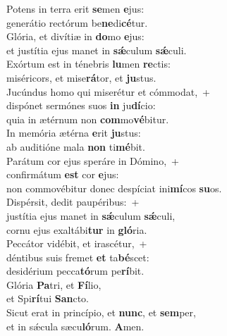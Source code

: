 \evenverse Potens in terra erit \textbf{se}men \textbf{e}jus:~\*\\
\evenverse generátio rectórum be\textbf{ne}di\textbf{cé}tur.\\
\oddverse Glória, et divítiæ in \textbf{do}mo \textbf{e}jus:~\*\\
\oddverse et justítia ejus manet in \textbf{sǽ}culum \textbf{sǽ}culi.\\
\evenverse Exórtum est in ténebris \textbf{lu}men \textbf{re}ctis:~\*\\
\evenverse miséricors, et mise\textbf{rá}tor, et \textbf{ju}stus.\\
\oddverse Jucúndus homo qui miserétur et cómmodat,~+\\
\oddverse  dispónet sermónes suos \textbf{in} ju\textbf{dí}cio:~\*\\
\oddverse quia in ætérnum non \textbf{com}mo\textbf{vé}bitur.\\
\evenverse In memória ætérna \textbf{e}rit \textbf{ju}stus:~\*\\
\evenverse ab auditióne mala \textbf{non} ti\textbf{mé}bit.\\
\oddverse Parátum cor ejus speráre in Dómino,~+\\
\oddverse  confirmátum \textbf{est} cor \textbf{e}jus:~\*\\
\oddverse non commovébitur donec despíciat ini\textbf{mí}cos \textbf{su}os.\\
\evenverse Dispérsit, dedit paupéribus:~+\\
\evenverse  justítia ejus manet in \textbf{sǽ}culum \textbf{sǽ}culi,~\*\\
\evenverse cornu ejus exaltábi\textbf{tur} in \textbf{gló}ria.\\
\oddverse Peccátor vidébit, et irascétur,~+\\
\oddverse  déntibus suis fremet \textbf{et} ta\textbf{bé}scet:~\*\\
\oddverse desidérium pecca\textbf{tó}rum pe\textbf{rí}bit.\\
\evenverse Glória \textbf{Pa}tri, et \textbf{Fí}lio,~\*\\
\evenverse et Spi\textbf{rí}tui \textbf{San}cto.\\
\oddverse Sicut erat in princípio, et \textbf{nunc}, et \textbf{sem}per,~\*\\
\oddverse et in sǽcula sæcu\textbf{ló}rum. \textbf{A}men.\\
